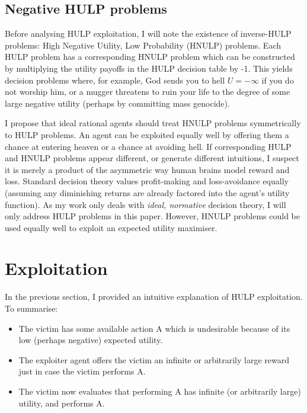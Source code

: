 \documentclass{article}
\begin{document}
\subsection{Negative HULP problems}

Before analysing HULP exploitation, I will note the existence of inverse-HULP problems: High Negative Utility, Low Probability (HNULP) problems. Each HULP problem has a corresponding HNULP problem which can be constructed by multiplying the utility payoffs in the HULP decision table by -1. This yields decision problems where, for example, God sends you to hell \(U=-\infty\) if you do not worship him, or a mugger threatens to ruin your life to the degree of some large negative utility (perhaps by committing mass genocide). 

I propose that ideal rational agents should treat HNULP problems symmetrically to HULP problems. An agent can be exploited equally well by offering them a chance at entering heaven or a chance at avoiding hell. If corresponding HULP and HNULP problems appear different, or generate different intuitions, I suspect it is merely a product of the asymmetric way human brains model reward and loss. Standard decision theory values profit-making and loss-avoidance equally (assuming any diminishing returns are already factored into the agent's utility function). As my work only deals with \textit{ideal, normative} decision theory, I will only address HULP problems in this paper. However, HNULP problems could be used equally well to exploit an expected utility maximiser.

\newpage\section{Exploitation}

In the previous section, I provided an intuitive explanation of HULP exploitation. To summarise:

\begin{itemize}
\item The victim has some available action A which is undesirable because of its low (perhaps negative) expected utility.
\item The exploiter agent offers the victim an infinite or arbitrarily large reward just in case the victim performs A. 
\item The victim now evaluates that performing A has infinite (or arbitrarily large) utility, and performs A.
\end{itemize}
\end{document}

